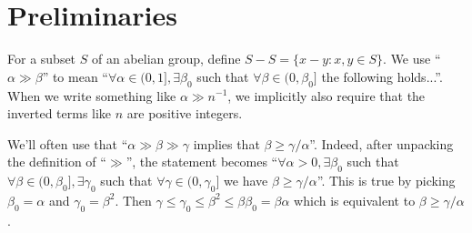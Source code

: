 \documentclass[a4paper,11pt,hidelinks]{amsart}
\theoremstyle{definition}
\begin{document}


    







\section{Preliminaries}\label{sec:preliminaries}
For a subset $S$ of an abelian group, define $S-S=\{x-y:x,y\in S\}$.
We use ``$\alpha\gg \beta$'' to mean ``$\forall \alpha\in (0,1], \exists \beta_0$ such that $\forall\beta\in (0, \beta_0]$ the following holds...''. When we write something like $\alpha \gg n^{-1}$, we implicitly also require that the inverted terms like $n$ are positive integers.

We'll often use that ``$\alpha\gg \beta\gg \gamma$ implies that $\beta \geq \gamma/\alpha$''. Indeed, after unpacking the definition of ``$\gg$'', the statement becomes ``$\forall \alpha>0, \exists \beta_0$ such that $\forall\beta\in(0, \beta_0], \exists \gamma_0$ such that $\forall \gamma\in (0, \gamma_0]$ we have $\beta \geq \gamma/\alpha$''. This is true by picking $\beta_0=\alpha$ and $\gamma_0=\beta^2$. Then $\gamma\leq \gamma_0\leq \beta^2\leq \beta \beta_0=\beta\alpha$ which is equivalent to $\beta \geq \gamma/\alpha$.
\end{document}
